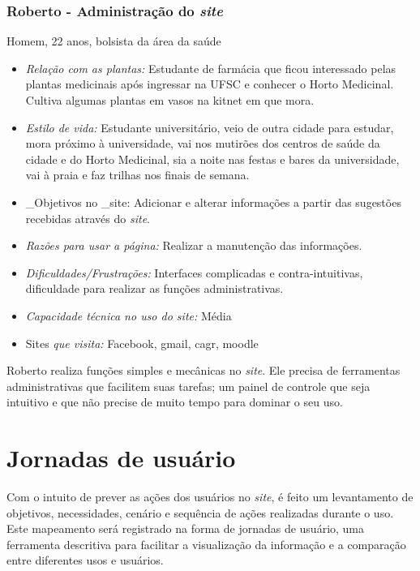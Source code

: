 \subsubsection{Roberto - Administração do \emph{site}}

Homem, 22 anos, bolsista da área da saúde

\begin{itemize}
\item
  \emph{Relação com as plantas:} Estudante de farmácia que ficou interessado pelas plantas medicinais após ingressar na UFSC e conhecer o Horto Medicinal. Cultiva algumas plantas em vasos na kitnet em que mora.
\item
  \emph{Estilo de vida:} Estudante universitário, veio de outra cidade para estudar, mora próximo à universidade, vai nos mutirões dos centros de saúde da cidade e do Horto Medicinal, sia a noite nas festas e bares da universidade, vai à praia e faz trilhas nos finais de semana.
\item
  \_Objetivos no \_site: Adicionar e alterar informações a partir das sugestões recebidas através do \emph{site}.
\item
  \emph{Razões para usar a página:} Realizar a manutenção das informações.
\item
  \emph{Dificuldades/Frustrações:} Interfaces complicadas e contra-intuitivas, dificuldade para realizar as funções administrativas.
\item
  \emph{Capacidade técnica no uso do \emph{site}:} Média
\item
  Sites \emph{que visita:} Facebook, gmail, cagr, moodle
\end{itemize}

Roberto realiza funções simples e mecânicas no \emph{site}. Ele precisa de ferramentas administrativas que facilitem suas tarefas; um painel de controle que seja intuitivo e que não precise de muito tempo para dominar o seu uso.

\section{Jornadas de usuário}\label{jornadas-de-usuario}

Com o intuito de prever as ações dos usuários no \emph{site}, é feito um levantamento de objetivos, necessidades, cenário e sequência de ações realizadas durante o uso. Este mapeamento será registrado na forma de jornadas de usuário, uma ferramenta descritiva para facilitar a visualização da informação e a comparação entre diferentes usos e usuários.

